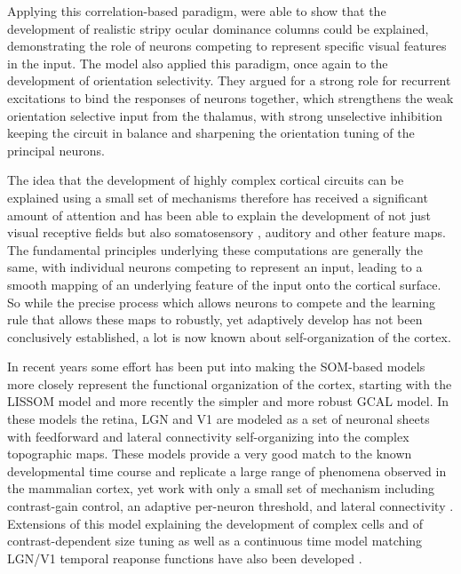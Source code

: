 Applying this correlation-based paradigm, \cite{Miller1989} were able
to show that the development of realistic stripy ocular dominance
columns could be explained, demonstrating the role of neurons
competing to represent specific visual features in the input. The
\cite{Somers1995} model also applied this paradigm, once again to the
development of orientation selectivity.  They argued for a strong role
for recurrent excitations to bind the responses of neurons together,
which strengthens the weak orientation selective input from the
thalamus, with strong unselective inhibition keeping the circuit in
balance and sharpening the orientation tuning of the principal
neurons.

The idea that the development of highly complex cortical circuits can
be explained using a small set of mechanisms therefore has received a
significant amount of attention and has been able to explain the
development of not just visual receptive fields but also somatosensory
\citep{Wilson2010}, auditory \cite{Khan2011} and other feature
maps. The fundamental principles underlying these computations are
generally the same, with individual neurons competing to represent an
input, leading to a smooth mapping of an underlying feature of the
input onto the cortical surface. So while the precise process which
allows neurons to compete and the learning rule that allows these maps
to robustly, yet adaptively develop has not been conclusively
established, a lot is now known about self-organization of the cortex.

In recent years some effort has been put into making the SOM-based
models more closely represent the functional organization of the
cortex, starting with the LISSOM model \citep{Bednar2003} and more
recently the simpler and more robust GCAL \citep{Stevens2013}
model. In these models the retina, LGN and V1 are modeled as a set of
neuronal sheets with feedforward and lateral connectivity
self-organizing into the complex topographic maps. These models
provide a very good match to the known developmental time course and
replicate a large range of phenomena observed in the mammalian cortex,
yet work with only a small set of mechanism including contrast-gain
control, an adaptive per-neuron threshold, and lateral connectivity
\citep{Stevens2013}. Extensions of this model explaining the
development of complex cells and of contrast-dependent size tuning
\citep{Antolik2011} as well as a continuous time model matching LGN/V1
temporal reaponse functions have also been developed
\citep{Stevens2011}.


